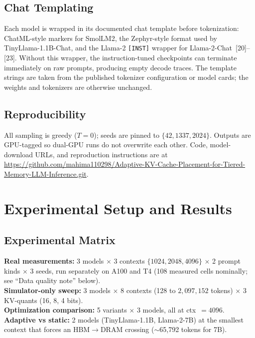 \documentclass[conference]{IEEEtran}
\begin{document}
\subsection{Chat Templating}

Each model is wrapped in its documented chat template before tokenization: ChatML-style markers for SmolLM2, the Zephyr-style format used by TinyLlama-1.1B-Chat, and the Llama-2 \texttt{[INST]} wrapper for Llama-2-Chat~[20]--[23]. Without this wrapper, the instruction-tuned checkpoints can terminate immediately on raw prompts, producing empty decode traces. The template strings are taken from the published tokenizer configuration or model cards; the weights and tokenizers are otherwise unchanged.

\subsection{Reproducibility}

All sampling is greedy ($T=0$); seeds are pinned to $\{42, 1337, 2024\}$. Outputs are GPU-tagged so dual-GPU runs do not overwrite each other. Code, model-download URLs, and reproduction instructions are at \url{https://github.com/mahima110298/Adaptive-KV-Cache-Placement-for-Tiered-Memory-LLM-Inference.git}.

\section{Experimental Setup and Results}
\label{sec:results}

\subsection{Experimental Matrix}

\textbf{Real measurements:} 3 models $\times$ 3 contexts $\{1024, 2048, 4096\}$ $\times$ 2 prompt kinds $\times$ 3 seeds, run separately on A100 and T4 (108 measured cells nominally; see ``Data quality note'' below).\\
\textbf{Simulator-only sweep:} 3 models $\times$ 8 contexts (128 to $2{,}097{,}152$ tokens) $\times$ 3 KV-quants (16, 8, 4 bits).\\
\textbf{Optimization comparison:} 5 variants $\times$ 3 models, all at ctx~$=4096$.\\
\textbf{Adaptive vs static:} 2 models (TinyLlama-1.1B, Llama-2-7B) at the smallest context that forces an HBM$\rightarrow$DRAM crossing ($\sim$65{,}792 tokens for 7B).
\end{document}
